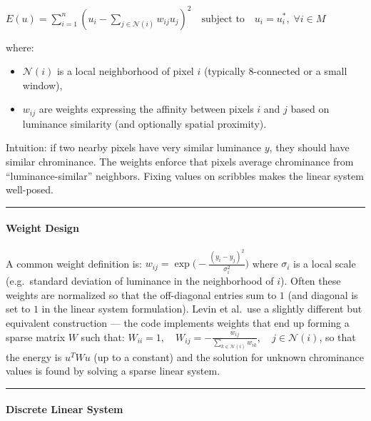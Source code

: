 \documentclass[11pt]{article}
\providecommand{\tightlist}{%
      \setlength{\itemsep}{0pt}\setlength{\parskip}{0pt}}
\begin{document}
\(E(u) = \sum\limits_{i=1}^{n}\left( u_i - \sum\limits_{j \in \mathcal{N}(i)} w_{ij} u_j \right)^2 \quad\text{subject to}\quad u_i = u_i^*,\; \forall i\in M\)

where:

\begin{itemize}
\tightlist
\item
  \(\mathcal{N}(i)\) is a local neighborhood of pixel \(i\) (typically
  \(8\)-connected or a small window),
\item
  \(w_{ij}\) are weights expressing the affinity between pixels \(i\)
  and \(j\) based on luminance similarity (and optionally spatial
  proximity).
\end{itemize}

Intuition: if two nearby pixels have very similar luminance \(y\), they
should have similar chrominance. The weights enforce that pixels average
chrominance from ``luminance-similar'' neighbors. Fixing values on
scribbles makes the linear system well-posed.

\begin{center}\rule{0.5\linewidth}{0.5pt}\end{center}

\hypertarget{weight-design}{%
\paragraph{\texorpdfstring{\textbf{Weight
Design}}{Weight Design}}\label{weight-design}}

A common weight definition is:
\(w_{ij} = \exp\Big(-\frac{(y_i - y_j)^2}{\sigma_i^2}\Big)\) where
\(\sigma_i\) is a local scale (e.g.~standard deviation of luminance in
the neighborhood of \(i\)). Often these weights are normalized so that
the off-diagonal entries sum to \(1\) (and diagonal is set to \(1\) in
the linear system formulation). Levin et al.~use a slightly different
but equivalent construction --- the code implements weights that end up
forming a sparse matrix \(W\) such that:
\(W_{ii} = 1, \quad W_{ij} = -\frac{w_{ij}}{\sum_{k\in\mathcal{N}(i)} w_{ik}}, \quad j\in\mathcal{N}(i)\),
so that the energy is \(u^T W u\) (up to a constant) and the solution
for unknown chrominance values is found by solving a sparse linear
system.

\begin{center}\rule{0.5\linewidth}{0.5pt}\end{center}

\hypertarget{discrete-linear-system}{%
\paragraph{\texorpdfstring{\textbf{Discrete Linear
System}}{Discrete Linear System}}\label{discrete-linear-system}}
\end{document}
